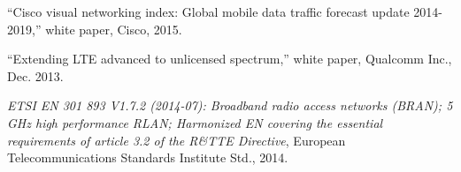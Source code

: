%

\begin{thebibliography}{99.}%
``Cisco visual networking index: Global mobile data traffic forecast update 2014-2019,'' white paper, Cisco, 2015.	
	
``Extending {LTE} advanced to unlicensed spectrum,'' white paper, Qualcomm Inc., Dec. 2013.

 \emph{ETSI EN 301 893 V1.7.2 (2014-07): Broadband radio access networks (BRAN);	5 GHz high performance RLAN; Harmonized EN covering the essential requirements of article 3.2 of the R\&TTE Directive}, European Telecommunications Standards Institute Std., 2014.	
\end{thebibliography}
